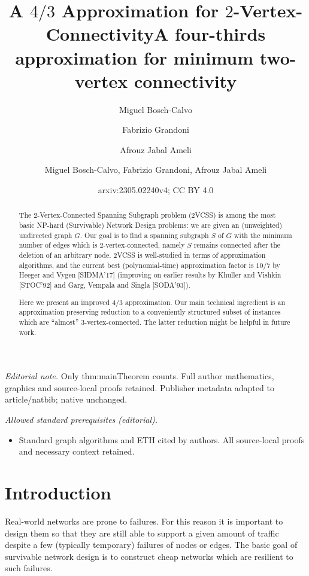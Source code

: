 \documentclass{article}
\author{Miguel Bosch-Calvo \and Fabrizio Grandoni \and Afrouz Jabal Ameli}\date{}
\title{A \texorpdfstring{$4/3$}{4/3} Approximation for \texorpdfstring{$2$}{2}-Vertex-Connectivity}
\title{A four-thirds approximation for minimum two-vertex connectivity}
\author{Miguel Bosch-Calvo, Fabrizio Grandoni, Afrouz Jabal Ameli}
\date{arxiv:2305.02240v4; CC BY 4.0}
\begin{document}
\maketitle
\noindent\textit{Editorial note.} Only thm:mainTheorem counts. Full author mathematics, graphics and source-local proofs retained. Publisher metadata adapted to article/natbib; native unchanged.\par\medskip
\noindent\textit{Allowed standard prerequisites (editorial).}\begin{itemize}
\item Standard graph algorithms and ETH cited by authors. All source-local proofs and necessary context retained.
\end{itemize}\medskip
\maketitle

\begin{abstract}
The 2-Vertex-Connected Spanning Subgraph problem (2VCSS) is among the most basic NP-hard (Survivable) Network Design problems: we are given an (unweighted) undirected graph $G$. Our goal is to find a spanning subgraph $S$ of $G$ with the minimum number of edges which is $2$-vertex-connected, namely $S$ remains connected after the deletion of an arbitrary node. 2VCSS is well-studied in terms of approximation algorithms, and the current best (polynomial-time) approximation factor is $10/7$ by Heeger and Vygen [SIDMA'17] (improving on earlier results by Khuller and Vishkin [STOC'92] and Garg, Vempala and Singla [SODA'93]).

Here we present an improved $4/3$ approximation. Our main technical ingredient is an approximation preserving reduction to a conveniently structured subset of instances which are ``almost'' 3-vertex-connected. The latter reduction might be helpful in future work. 
\end{abstract}

\section{Introduction}

Real-world networks are prone to failures. For this reason it is important to design them so that they are still able to support a given amount of traffic despite a few (typically temporary) failures of nodes or edges. The basic goal of survivable network design is to construct cheap networks which are resilient to such failures. 
\end{document}
